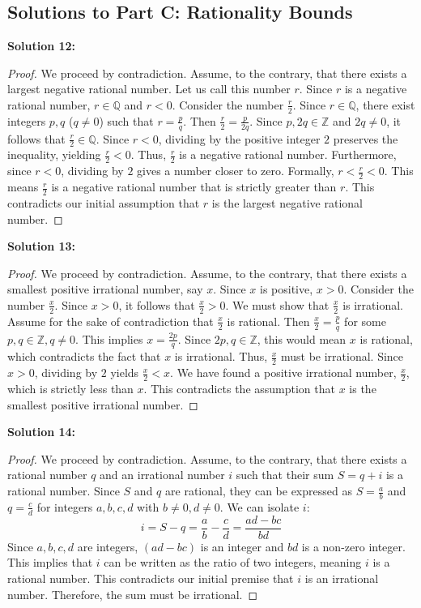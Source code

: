 \documentclass[11pt]{article}
\theoremstyle{definition}
\begin{document}
\subsection*{Solutions to Part C: Rationality Bounds}

\textbf{Solution 12:}
\begin{proof}
We proceed by contradiction. Assume, to the contrary, that there exists a largest negative rational number. Let us call this number $r$. Since $r$ is a negative rational number, $r \in \mathbb{Q}$ and $r < 0$. Consider the number $\frac{r}{2}$. Since $r \in \mathbb{Q}$, there exist integers $p, q$ ($q \neq 0$) such that $r = \frac{p}{q}$. Then $\frac{r}{2} = \frac{p}{2q}$. Since $p, 2q \in \mathbb{Z}$ and $2q \neq 0$, it follows that $\frac{r}{2} \in \mathbb{Q}$. Since $r < 0$, dividing by the positive integer $2$ preserves the inequality, yielding $\frac{r}{2} < 0$. Thus, $\frac{r}{2}$ is a negative rational number. Furthermore, since $r < 0$, dividing by $2$ gives a number closer to zero. Formally, $r < \frac{r}{2} < 0$. This means $\frac{r}{2}$ is a negative rational number that is strictly greater than $r$. This contradicts our initial assumption that $r$ is the largest negative rational number.
\end{proof}

\textbf{Solution 13:}
\begin{proof}
We proceed by contradiction. Assume, to the contrary, that there exists a smallest positive irrational number, say $x$. Since $x$ is positive, $x > 0$. Consider the number $\frac{x}{2}$. Since $x > 0$, it follows that $\frac{x}{2} > 0$. We must show that $\frac{x}{2}$ is irrational. Assume for the sake of contradiction that $\frac{x}{2}$ is rational. Then $\frac{x}{2} = \frac{p}{q}$ for some $p, q \in \mathbb{Z}, q \neq 0$. This implies $x = \frac{2p}{q}$. Since $2p, q \in \mathbb{Z}$, this would mean $x$ is rational, which contradicts the fact that $x$ is irrational. Thus, $\frac{x}{2}$ must be irrational. Since $x > 0$, dividing by $2$ yields $\frac{x}{2} < x$. We have found a positive irrational number, $\frac{x}{2}$, which is strictly less than $x$. This contradicts the assumption that $x$ is the smallest positive irrational number.
\end{proof}

\textbf{Solution 14:}
\begin{proof}
We proceed by contradiction. Assume, to the contrary, that there exists a rational number $q$ and an irrational number $i$ such that their sum $S = q + i$ is a rational number. Since $S$ and $q$ are rational, they can be expressed as $S = \frac{a}{b}$ and $q = \frac{c}{d}$ for integers $a, b, c, d$ with $b \neq 0, d \neq 0$. We can isolate $i$:
\[ i = S - q = \frac{a}{b} - \frac{c}{d} = \frac{ad - bc}{bd} \]
Since $a, b, c, d$ are integers, $(ad - bc)$ is an integer and $bd$ is a non-zero integer. This implies that $i$ can be written as the ratio of two integers, meaning $i$ is a rational number. This contradicts our initial premise that $i$ is an irrational number. Therefore, the sum must be irrational.
\end{proof}
\end{document}
